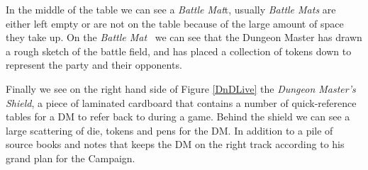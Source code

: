 \documentclass[review]{cmpreport}
\begin{document}
	In the middle of the table we can see a \emph{Battle Mat}t, usually \emph{Battle Mats} are either left empty or are not on the table because of the large amount of space they take up. On the \emph{Battle Mat} \ we can see that the Dungeon Master has drawn a rough sketch of the battle field, and has placed a collection of tokens down to represent the party and their opponents. 
	
	Finally we see on the right hand side of Figure \ref{DnDLive} the \emph{Dungeon Master's Shield}, a piece of laminated cardboard that contains a number of quick-reference tables for a DM to refer back to during a game. Behind the shield we can see a large scattering of die, tokens and pens for the DM. In addition to a pile of source books and notes that keeps the DM on the right track according to his grand plan for the Campaign.
	\clearpage	

\end{document}
